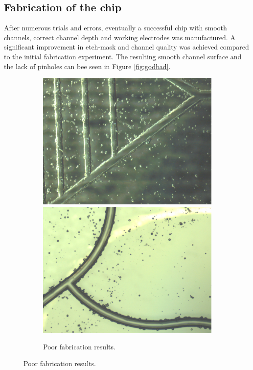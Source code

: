 \documentclass[final]{jyflluk}
\begin{document}
\subsection{Fabrication of the chip}
After numerous trials and errors, eventually a successful chip with smooth channels, correct channel depth and working electrodes was manufactured. A significant improvement in etch-mask and channel quality was achieved compared to the initial fabrication experiment. The resulting smooth channel surface and the lack of pinholes can bee seen in Figure \ref{fig:godbad}. 
\vaali
\begin{figure}[!h]
    \centering
    \begin{subfigure}{1.0\textwidth}
        \includegraphics[width=.48\linewidth]{optical/bad1.png}\quad\includegraphics[width=.48\linewidth]{optical/bad2.png}
        \qquad
        \caption{Poor fabrication results.} \label{fig:bad0}
    \end{subfigure}


\end{figure}
\end{document}
